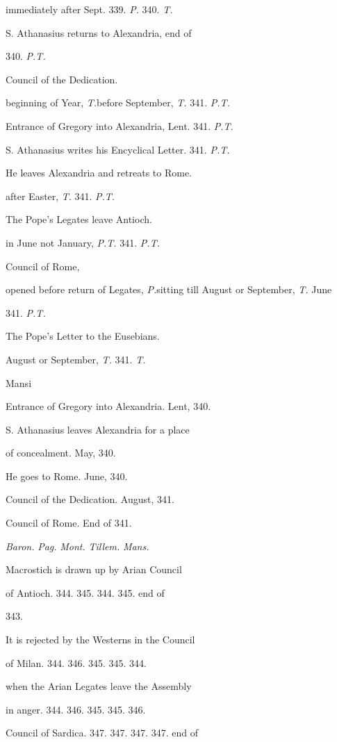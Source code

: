 immediately after Sept. 339. \emph{P.}
340. \emph{T.}

S. Athanasius returns to
Alexandria,
end of

340. \emph{P.T.}

Council of the Dedication.

beginning
of Year, \emph{T.}before
September, \emph{T.}
341. \emph{P.T.}

Entrance of Gregory into
Alexandria, Lent.
341. \emph{P.T.}

S. Athanasius writes his
Encyclical Letter.
341. \emph{P.T.}

He leaves Alexandria and
retreats to Rome.

after
Easter, \emph{T}.
341. \emph{P.T.}

The Pope's Legates leave
Antioch.

in
June not January, \emph{P.T.}
341. \emph{P.T.}

Council of Rome,

opened before return of Legates, \emph{P.}sitting
till August or September, \emph{T.}
June

341. \emph{P.T.}

The Pope's Letter to the
Eusebians.

August or September, \emph{T.} 341. \emph{T.}

Mansi

Entrance of Gregory into
Alexandria.
Lent, 340.

S. Athanasius leaves
Alexandria for a place 

of concealment.
May, 340.

He goes to Rome.
June, 340.

Council of the Dedication.
August, 341.

Council of Rome.
End of 341.

\emph{Baron.}
\emph{Pag.}
\emph{Mont.}
\emph{Tillem.}
\emph{Mans.}

Macrostich is
drawn up by Arian Council

of Antioch.
344.
345.
344.
345.
end of

343.

It is
rejected by the Westerns in the Council

of Milan.
344.
346.
345.
345.
344.

when the Arian Legates leave the Assembly

in anger.
344.
346.
345.
345.
346.

Council of
Sardica.
347.
347.
347.
347.
end of


